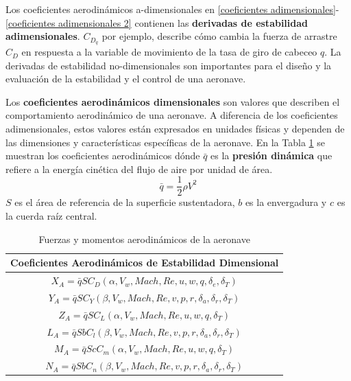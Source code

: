 Los coeficientes aerodinámicos a-dimensionales en \ref{coeficientes adimensionales}-\ref{coeficientes adimensionales 2} contienen las \textbf{derivadas de estabilidad adimensionales}. $ C_{D_{q}}$ por ejemplo, describe cómo cambia la fuerza de arrastre $C_D$ en respuesta a la variable de movimiento de la tasa de giro de cabeceo $q$. La derivadas de estabilidad no-dimensionales son importantes para el diseño y la evaluación de la estabilidad y el control de una aeronave.

Los \textbf{coeficientes aerodinámicos dimensionales} son valores que describen el comportamiento aerodinámico de una aeronave. A diferencia de los coeficientes adimensionales, estos valores están expresados en unidades físicas y dependen de las dimensiones y características específicas de la aeronave.
En la Tabla \ref{Fuerzas y momentos aerodinámicos de la aeronave 2} se muestran los coeficientes aerodinámicos  dónde $\bar{q}$ es la \textbf{presión dinámica} que refiere a la energía cinética del flujo de aire por unidad de área.
\begin{equation}
    \bar{q} = \frac{1}{2} \rho V^2
\end{equation}
$S$ es el área de referencia de la superficie sustentadora, $b$ es la envergadura y $c$ es la cuerda raíz central.
\begin{table}[!h]
    \centering
    \begin{tabular}{|c|}
    \hline
    \textbf{Coeficientes Aerodinámicos de Estabilidad Dimensional}\\
    \hline
    $X_{A} = \bar{q} S C_{D} (\alpha, V_w, Mach, Re, u, w, q, \delta_e, \delta_T)$ \\
    $Y_{A} = \bar{q} S C_{Y} (\beta, V_w, Mach, Re, v, p, r, \delta_a , \delta_r, \delta_T)$  \\
    $Z_{A} = \bar{q} S C_{L} (\alpha, V_w, Mach, Re, u, w, q, \delta_T)$    \\
    $L_{A} = \bar{q} S b C_{l} (\beta,V_w, Mach, Re, v, p, r, \delta_a , \delta_r, \delta_T)$ \\
    $M_{A} = \bar{q} S c C_{m} (\alpha, V_w, Mach, Re, u, w, q, \delta_T)$  \\
    $N_{A} = \bar{q} S b C_{n} (\beta, V_w, Mach, Re, v, p, r, \delta_a , \delta_r, \delta_T)$  \\
    \hline
    \end{tabular}
    \caption{Fuerzas y momentos aerodinámicos de la aeronave}
    \label{Fuerzas y momentos aerodinámicos de la aeronave 2}
\end{table}


